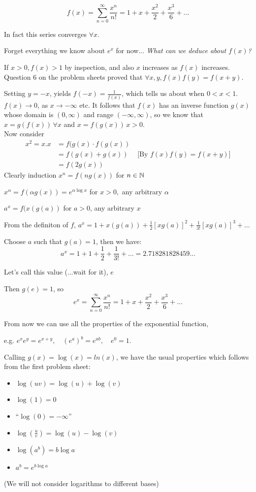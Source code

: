 \documentclass[10pt]{scrartcl}
\begin{document}

\[f(x) = \sum_{n=0}^{\infty} \frac{x^n}{n!} = 1 + x + \frac{x^2}{2} + \frac{x^3}{6} + \dots\]

In fact this series converges $\forall x$.

Forget everything we know about $e^x$ for now... \emph{What can we deduce about $f(x)$?}

If $x>0, f(x) > 1$ by inspection, and also $x$ increases as $f(x)$ increases. Question 6 on the problem sheets proved that $\forall x,y, f(x)f(y) = f(x+y)$. 

Setting $y = -x$, yields $f(-x) = \frac{1}{f(x)}$, which tells us about when $ 0<x <1$. $f(x) \to 0$, as $x \to -\infty$ etc. It follows that $f(x)$ has an inverse function $g(x)$ whose domain is $(0,\infty)$ and range $(-\infty,\infty)$, so we know that $x = g(f(x)) \, \forall x$ and $x = f(g(x)) \, x>0$.\\

Now consider 
\[
\begin{aligned}
  x^2 = x.x &= f(g(x)\cdot f(g(x))\\
  &= f(g(x) + g(x)) \quad \mbox{ [By $f(x)f(y) = f(x+y)$]}\\
  &= f(2g(x))
\end{aligned}
\]
Clearly induction $x^n = f(ng(x))$ for $n \in \mathbb{N}$\\

\begin{definition} 
$x^{\alpha} = f(\alpha g(x)) = e^{\alpha \log x}$ for $x >0,$ any arbitrary $\alpha$

$a^x = f(x(g(a))$ for $a > 0$, any arbitrary $x$
\end{definition}


From the definiton of $f$, $a^x = 1 + x(g(a)) + \frac{1}{2} [xg(a)]^2 + \frac{1}{3!}[xg(a)]^3 + \dots$

Choose $a$ such that $g(a) = 1$, then we have:
\[a^x = 1 + 1 + \frac{1}{2} + \frac{1}{3!} + \dots = 2.718281828459...\]

Let's call this value (...wait for it), $e$

 Then $g(e) = 1$, so 
 \[e^x = \sum_{n=0}^{\infty} \frac{x^n}{n!} = 1 + x + \frac{x^2}{2} + \frac{x^3}{6} + \dots \]

From now we can use all the properties of the exponential function,

 e.g. $e^xe^y = e^{x+y}, \quad (e^a)^b = e^{ab}, \quad e^0 = 1$. 

Calling $g(x) = \log(x) = ln(x)$, we have the usual properties which follows from the first problem sheet:\\[-.2cm]
\begin{itemize}
\item $\log(uv) = \log(u) + \log(v)$
\item $\log(1) = 0$
\item ``$\log(0)= -\infty$''
\item $\log (\frac{u}{v}) = \log(u) - \log(v)$
\item $\log(a^b) = b\log a$
\item $a^b = e^{b \log a}$
\end{itemize}
(We will not consider logarithms to different bases)
\end{document}
